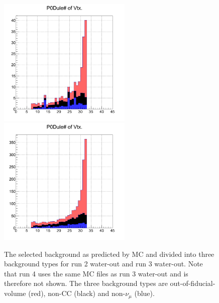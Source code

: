 \begin{figure}[h]
\centering
\includegraphics[width=2.5in]{Figures/TN100Plots/cBG2a.png}
\includegraphics[width=2.5in]{Figures/TN100Plots/cBG3a.png}
\caption{The selected background as predicted by MC and divided into three background types for run 2 water-out and run 3 water-out. Note that run 4 uses the same MC files as run 3 water-out and is therefore not shown. The three background types are out-of-fiducial-volume (red), non-CC (black) and non-$\nu_\mu$ (blue).}
\label{fig:xsbgruna}
\end{figure}

